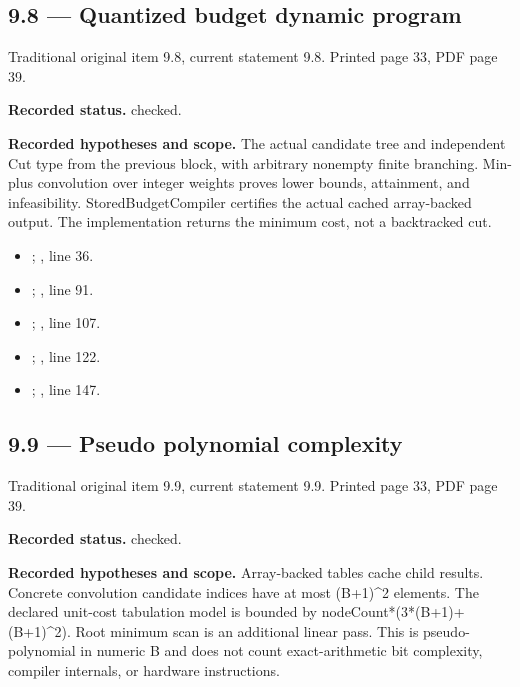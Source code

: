 \subsection{9.8 — Quantized budget dynamic program}
\label{result:9.8}
{\footnotesize\color{muted}Traditional original item 9.8, current statement 9.8. Printed page 33, PDF page 39.}\par
\textbf{Recorded status.} checked.

\textbf{Recorded hypotheses and scope.} The actual candidate tree and independent Cut type from the previous block, with arbitrary nonempty finite branching. Min-plus convolution over integer weights proves lower bounds, attainment, and infeasibility. StoredBudgetCompiler certifies the actual cached array-backed output. The implementation returns the minimum cost, not a backtracked cut.

\begin{itemize}
\item {}; , line 36.
\item {}; , line 91.
\item {}; , line 107.
\item {}; , line 122.
\item {}; , line 147.
\end{itemize}
\subsection{9.9 — Pseudo polynomial complexity}
\label{result:9.9}
{\footnotesize\color{muted}Traditional original item 9.9, current statement 9.9. Printed page 33, PDF page 39.}\par
\textbf{Recorded status.} checked.

\textbf{Recorded hypotheses and scope.} Array-backed tables cache child results. Concrete convolution candidate indices have at most (B+1)\textasciicircum{}2 elements. The declared unit-cost tabulation model is bounded by nodeCount*(3*(B+1)+(B+1)\textasciicircum{}2). Root minimum scan is an additional linear pass. This is pseudo-polynomial in numeric B and does not count exact-arithmetic bit complexity, compiler internals, or hardware instructions.

